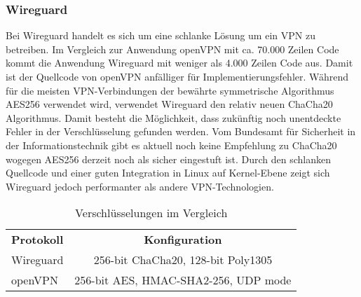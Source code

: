 \newpage
\subsubsection{Wireguard}

Bei Wireguard handelt es sich um eine schlanke L\"osung um ein \ac{VPN} zu betreiben. Im Vergleich zur Anwendung openVPN mit ca. 70.000 Zeilen Code kommt die Anwendung Wireguard mit weniger als 4.000 Zeilen Code aus. 
Damit ist der Quellcode von openVPN anf\"alliger f\"ur Implementierungsfehler. W\"ahrend f\"ur die meisten VPN-Verbindungen der bew\"ahrte symmetrische Algorithmus AES256 verwendet wird, verwendet Wireguard den relativ neuen ChaCha20 Algorithmus. Damit besteht die M\"oglichkeit, dass zuk\"unftig noch unentdeckte Fehler in der Verschl\"usselung gefunden werden. Vom Bundesamt f\"ur Sicherheit in der Informationstechnik gibt es aktuell noch keine Empfehlung zu ChaCha20 wogegen AES256 derzeit noch als sicher eingestuft ist.  
Durch den schlanken Quellcode und einer guten Integration in Linux auf Kernel-Ebene zeigt sich Wireguard jedoch performanter als andere VPN-Technologien.   

\begin{table}[ht]
   \begin{center}
      \begin{tabular}{lc}\toprule
         \textbf{Protokoll}	&\textbf{Konfiguration} \\ 	
         Wireguard	& 256-bit ChaCha20, 128-bit Poly1305 \\
         openVPN	& 256-bit AES, HMAC-SHA2-256, UDP mode \\
      \end{tabular}
   \end{center}
   \caption{Verschlüsselungen im Vergleich}
\end{table}

